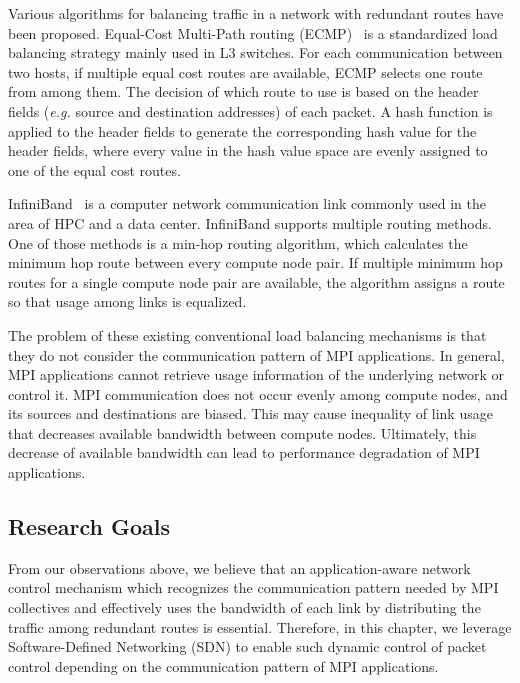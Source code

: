 Various algorithms for balancing traffic in a network with redundant
routes have been proposed. Equal-Cost Multi-Path routing (ECMP)~\autocite{ecmp} is
a standardized load balancing strategy mainly used in L3 switches. For each
communication between two hosts, if multiple equal cost routes are available,
ECMP selects one route from among them. The decision of which route to use is
based on the header fields (\emph{e.g.} source and destination addresses) of
each packet. A hash function is applied to the header fields to generate the
corresponding hash value for the header fields, where every value in the hash
value space are evenly assigned to one of the equal cost routes.

InfiniBand~\autocite{Buyya2009} is a computer network communication link
commonly used in the area of HPC and a data center. InfiniBand supports
multiple routing methods. One of those methods is a min-hop routing
algorithm, which calculates the minimum hop route between every
compute node pair. If multiple minimum hop routes for a single
compute node pair are available, the algorithm assigns a route so that
usage among links is equalized.

The problem of these existing conventional load balancing mechanisms is
that they do not consider the communication pattern of MPI
applications. In general, MPI applications cannot retrieve usage
information of the underlying network or control it. MPI communication
does not occur evenly among compute nodes, and its sources and
destinations are biased. This may cause inequality of link usage that
decreases available bandwidth between compute nodes. Ultimately, this
decrease of available bandwidth can lead to performance degradation of MPI
applications.

\subsection{Research Goals}

From our observations above, we believe that an application-aware network
control mechanism which recognizes the communication pattern needed by MPI
collectives and effectively uses the bandwidth of each link by distributing
the traffic among redundant routes is essential. Therefore, in this chapter,
we leverage Software-Defined Networking (SDN) to enable such dynamic control
of packet control depending on the communication pattern of MPI applications.

